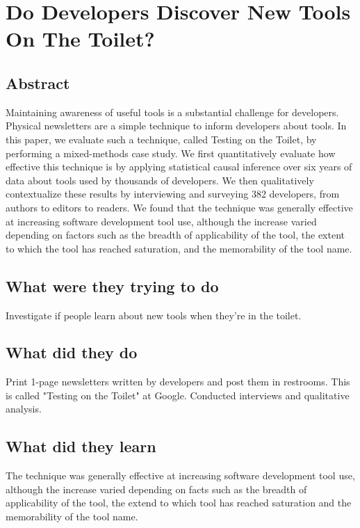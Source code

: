\section{Do Developers Discover New Tools On The Toilet?}

\subsection{Abstract}

Maintaining awareness of useful tools is a
substantial challenge for developers. Physical newsletters are a simple technique to inform developers about
tools. In this paper, we evaluate such a technique, called
Testing on the Toilet, by performing a mixed-methods
case study. We first quantitatively evaluate how effective this technique is by applying statistical causal inference over six years of data about tools used by thousands of developers. We then qualitatively contextualize these results by interviewing and surveying 382 developers, from authors to editors to readers. We found
that the technique was generally effective at increasing
software development tool use, although the increase
varied depending on factors such as the breadth of applicability of the tool, the extent to which the tool has
reached saturation, and the memorability of the tool
name.

\subsection{What were they trying to do}

Investigate if people learn about new tools when they're in the toilet.

\subsection{What did they do}

Print 1-page newsletters written by developers and post them in restrooms. This is called "Testing on the Toilet" at Google. Conducted interviews and qualitative analysis.

\subsection{What did they learn}

The technique was generally effective at increasing software development tool use, although the increase varied depending on facts such as the breadth of applicability of the tool, the extend to which tool has reached saturation and the memorability of the tool name.


